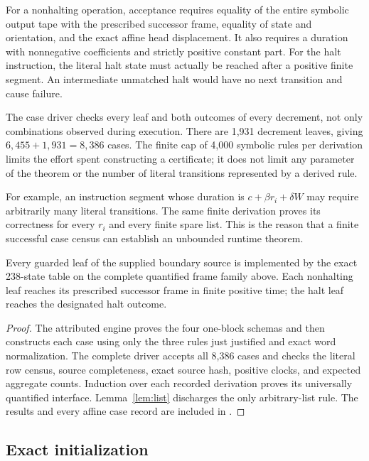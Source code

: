 For a nonhalting operation, acceptance requires equality of the
entire symbolic output tape with the prescribed successor frame,
equality of state and orientation, and the exact affine head
displacement. It also requires a duration with nonnegative
coefficients and strictly positive constant part.
For the halt instruction, the literal halt state must actually
be reached after a positive finite segment. An intermediate
unmatched halt would have no next transition and cause failure.

The case driver checks every leaf and both outcomes of every
decrement, not only combinations observed during execution.
There are 1,931 decrement leaves, giving
$6,455+1,931=8,386$ cases. The finite cap of 4,000 symbolic rules
per derivation limits the effort spent constructing a certificate;
it does not limit any parameter of the theorem or the number of
literal transitions represented by a derived rule.

For example, an instruction segment whose duration is
$c+\beta r_i+\delta W$ may require arbitrarily many literal
transitions. The same finite derivation proves its correctness for
every $r_i$ and every finite spare list. This is the reason that a
finite successful case census can establish an unbounded runtime
theorem.

\begin{proposition}
\label{prop:runtime}
Every guarded leaf of the supplied boundary source is implemented
by the exact 238-state table on the complete quantified frame
family above. Each nonhalting leaf reaches its prescribed successor
frame in finite positive time; the halt leaf reaches the designated
halt outcome.
\end{proposition}
\begin{proof}
The attributed engine proves the four one-block schemas and then
constructs each case using only the three rules just justified and
exact word normalization. The complete driver accepts all 8,386
cases and checks the literal row census, source completeness, exact
source hash, positive clocks, and expected aggregate counts.
Induction over each recorded derivation proves its universally
quantified interface. Lemma~\ref{lem:list} discharges the only
arbitrary-list rule. The results and every affine case record are
included in .
\end{proof}

\subsection{Exact initialization}
\label{sec:boot}

